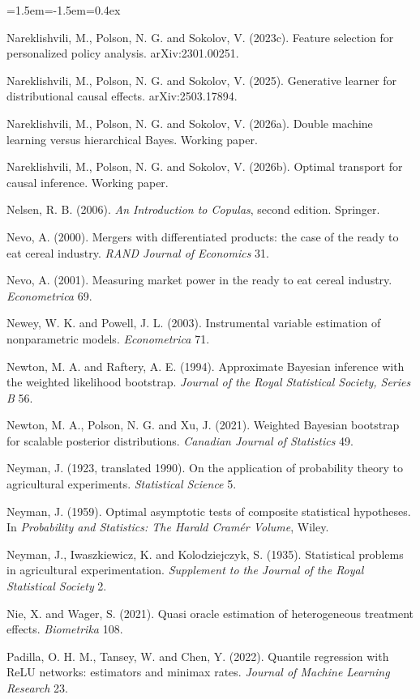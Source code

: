 \begin{list}{}{\leftmargin=1.5em\itemindent=-1.5em\itemsep=0.4ex}
\item Nareklishvili, M., Polson, N. G. and Sokolov, V. (2023c). Feature selection for personalized policy analysis. arXiv:2301.00251.
\item Nareklishvili, M., Polson, N. G. and Sokolov, V. (2025). Generative learner for distributional causal effects. arXiv:2503.17894.
\item Nareklishvili, M., Polson, N. G. and Sokolov, V. (2026a). Double machine learning versus hierarchical Bayes. Working paper.
\item Nareklishvili, M., Polson, N. G. and Sokolov, V. (2026b). Optimal transport for causal inference. Working paper.
\item Nelsen, R. B. (2006). \emph{An Introduction to Copulas}, second edition. Springer.
\item Nevo, A. (2000). Mergers with differentiated products: the case of the ready to eat cereal industry. \emph{RAND Journal of Economics} 31.
\item Nevo, A. (2001). Measuring market power in the ready to eat cereal industry. \emph{Econometrica} 69.
\item Newey, W. K. and Powell, J. L. (2003). Instrumental variable estimation of nonparametric models. \emph{Econometrica} 71.
\item Newton, M. A. and Raftery, A. E. (1994). Approximate Bayesian inference with the weighted likelihood bootstrap. \emph{Journal of the Royal Statistical Society, Series B} 56.
\item Newton, M. A., Polson, N. G. and Xu, J. (2021). Weighted Bayesian bootstrap for scalable posterior distributions. \emph{Canadian Journal of Statistics} 49.
\item Neyman, J. (1923, translated 1990). On the application of probability theory to agricultural experiments. \emph{Statistical Science} 5.
\item Neyman, J. (1959). Optimal asymptotic tests of composite statistical hypotheses. In \emph{Probability and Statistics: The Harald Cram\'er Volume}, Wiley.
\item Neyman, J., Iwaszkiewicz, K. and Kolodziejczyk, S. (1935). Statistical problems in agricultural experimentation. \emph{Supplement to the Journal of the Royal Statistical Society} 2.
\item Nie, X. and Wager, S. (2021). Quasi oracle estimation of heterogeneous treatment effects. \emph{Biometrika} 108.
\item Padilla, O. H. M., Tansey, W. and Chen, Y. (2022). Quantile regression with ReLU networks: estimators and minimax rates. \emph{Journal of Machine Learning Research} 23.

\end{list}
